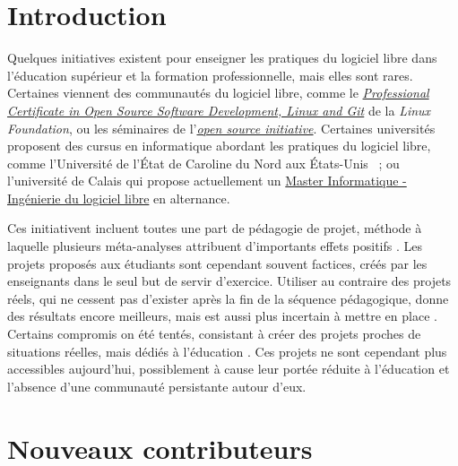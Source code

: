 \documentclass[dvipsnames,runningheads]{llncs}
\newcommand{\en}[1]{\foreignlanguage{english}{\emph{#1}}}
\begin{document}

    \section{Introduction}

    Quelques initiatives existent pour enseigner les pratiques du logiciel libre dans l'éducation supérieur et
    la formation professionnelle, mais elles sont rares. Certaines viennent des communautés du logiciel libre,
    comme le
    \href{https://www.edx.org/professional-certificate/linuxfoundationx-open-source-software-development-linux-and-git}{\en{Professional
    Certificate in Open Source Software Development, Linux and Git}} de la \en{Linux Foundation}, ou les
    séminaires de l'\href{https://opensource.org/osi-open-source-education}{\en{open source initiative}}.
    Certaines universités proposent des cursus en informatique abordant les pratiques du logiciel libre, comme
    l'Université de l'État de Caroline du Nord aux États-Unis \parencite{oss-edu-2008} ; ou
    l'université de Calais qui propose actuellement un
    \href{https://www.univ-littoral.fr/formation/offre-de-formation/masters/master-informatique-ingenierie-du-logiciel-libre/}{Master
    Informatique - Ingénierie du logiciel libre} en alternance.

    Ces initiativent incluent toutes une part de pédagogie de projet, méthode à laquelle plusieurs
    méta-analyses attribuent d'importants effets positifs \cite{pbl-2019, pbl-2018}. Les projets proposés aux
    étudiants sont cependant souvent factices, créés par les enseignants dans le seul but de servir
    d'exercice. Utiliser au contraire des projets réels, qui ne cessent pas d'exister après la fin de la
    séquence pédagogique, donne des résultats encore meilleurs, mais est aussi plus incertain à mettre en
    place \cite{real-pbl-2010, real-pbl-2004}. Certains compromis on été tentés, consistant à créer des
    projets proches de situations réelles, mais dédiés à l'éducation \cite{oss-edu-2008}. Ces projets ne sont
    cependant plus accessibles aujourd'hui, possiblement à cause leur portée réduite à l'éducation et
    l'absence d'une communauté persistante autour d'eux.

    \section{Nouveaux contributeurs}
\end{document}
